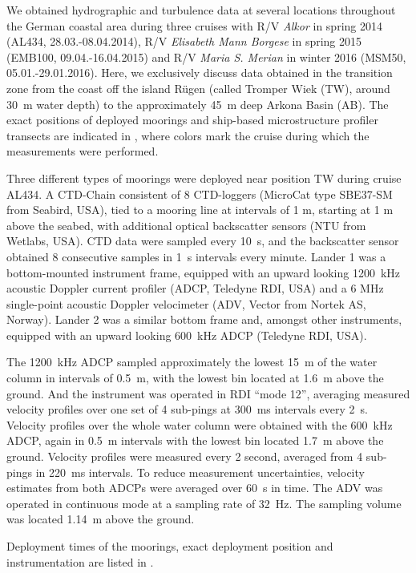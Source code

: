 We obtained hydrographic and turbulence data at several locations throughout the 
German coastal area during three cruises with R/V \textit{Alkor} in spring 2014 
(AL434, 28.03.-08.04.2014), R/V \textit{Elisabeth Mann Borgese} in spring 2015 
(EMB100, 09.04.-16.04.2015) and R/V \textit{Maria S. Merian} in winter 2016 
(MSM50, 05.01.-29.01.2016). Here, we exclusively discuss data obtained in the 
transition zone from the coast off 
the island R\"{u}gen (called Tromper Wiek (TW), around 30~m water depth) to 
the approximately 45~m deep Arkona Basin (AB). The exact positions of deployed 
moorings and ship-based microstructure profiler transects are indicated in 
, where colors mark the cruise during which the measurements 
were performed.

Three different types of moorings were deployed near position TW during cruise 
AL434. A CTD-Chain consistent of 8 CTD-loggers (MicroCat type SBE37-SM from 
Seabird, USA), tied to a mooring line at intervals of 1 m, starting at 1 m above 
the seabed, with additional optical backscatter sensors (NTU from Wetlabs, USA). 
CTD data were sampled every 10~s, and the backscatter sensor obtained 8 
consecutive samples in 1~s intervals every minute.
Lander 1 was a bottom-mounted instrument frame, equipped with an upward looking 
1200~kHz acoustic Doppler current profiler (ADCP, Teledyne RDI, USA) and a 6 
MHz single-point acoustic Doppler velocimeter (ADV, Vector from Nortek AS, 
Norway).
Lander 2 was a similar bottom frame and, amongst other instruments, equipped 
with an upward looking 600~kHz ADCP (Teledyne RDI, USA).

The 1200~kHz ADCP sampled approximately the lowest 15~m of the water column in 
intervals of 0.5~m, with the lowest bin located at 1.6~m above the ground. 
And the instrument was operated in RDI ``mode 12'', 
averaging measured velocity profiles over one set of 4 sub-pings at 300~ms 
intervals every 2~s. 
Velocity profiles over the whole water column were 
obtained with the 600~kHz ADCP, again in 0.5~m intervals with the lowest bin 
located 1.7~m above the ground. Velocity profiles were measured every 2 second, 
averaged from 4 sub-pings in 220~ms intervals. To reduce measurement 
uncertainties, velocity estimates from both ADCPs were averaged over 60~s in 
time. 
The ADV was operated in continuous mode at a sampling rate of 32~Hz. The 
sampling volume was located 1.14~m above the ground.

Deployment times of the moorings, exact deployment position and instrumentation 
are listed in .

